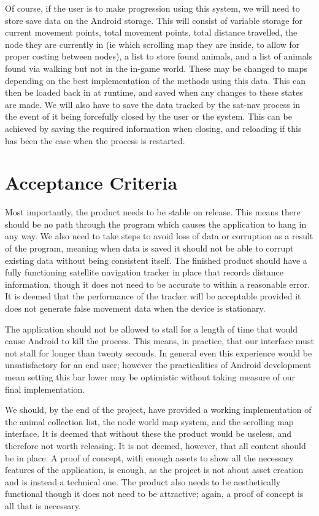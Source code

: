 \documentclass[12pt,a4paper,twoside]{article}
\begin{document}
Of course, if the user is to make progression using this system, we will need to store save data on the Android storage.
This will consist of variable storage for current movement points, total movement points, total distance travelled, the node they are currently in (ie which scrolling map they are inside, to allow for proper costing between nodes), a list to store found animals, and a list of animals found via walking but not in the in-game world.
These may be changed to maps depending on the best implementation of the methods using this data.
This can then be loaded back in at runtime, and saved when any changes to these states are made.
We will also have to save the data tracked by the sat-nav process in the event of it being forcefully closed by the user or the system.
This can be achieved by saving the required information when closing, and reloading if this has been the case when the process is restarted.

\section{Acceptance Criteria}
Most importantly, the product needs to be stable on release.
This means there should be no path through the program which causes the application to hang in any way.
We also need to take steps to avoid loss of data or corruption as a result of the program, meaning when data is saved it should not be able to corrupt existing data without being consistent itself.
The finished product should have a fully functioning satellite navigation tracker in place that records distance information, though it does not need to be accurate to within a reasonable error.
It is deemed that the performance of the tracker will be acceptable provided it does not generate false movement data when the device is stationary.


The application should not be allowed to stall for a length of time that would cause Android to kill the process.
This means, in practice, that our interface must not stall for longer than twenty seconds.
In general even this experience would be unsatisfactory for an end user; however the practicalities of Android development mean setting this bar lower may be optimistic without taking measure of our final implementation.

We should, by the end of the project, have provided a working implementation of the animal collection list, the node world map system, and the scrolling map interface.
It is deemed that without these the product would be useless, and therefore not worth releasing.
It is not deemed, however, that all content should be in place.
A proof of concept, with enough assets to show all the necessary features of the application, is enough, as the project is not about asset creation and is instead a technical one.
The product also needs to be aesthetically functional though it does not need to be attractive; again, a proof of concept is all that is necessary.
\end{document}

